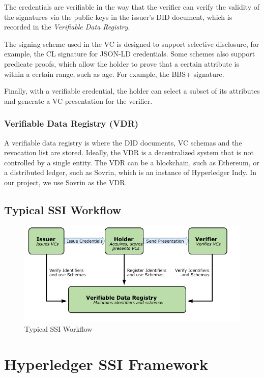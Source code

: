 \documentclass[
]{report}
\begin{document}
The credentials are verifiable in the way that the verifier can verify the
validity of the signatures via the public keys in the issuer's DID document,
which is recorded in the \emph{Verifiable Data Registry}.

The signing scheme used in the VC is designed to support selective disclosure,
for example, the CL signature for JSON-LD credentials. Some schemes also 
support predicate proofs, which allow the holder to prove that a certain
attribute is within a certain range, such as age. For example, the BBS+ 
signature.

Finally, with a verifiable credential, the holder can select a subset of its
attributes and generate a VC presentation for the verifier.

\subsubsection{Verifiable Data Registry (VDR)}
A verifiable data registry is where the DID documents, VC schemas and the
revocation list are stored. Ideally, the VDR is a decentralized system that
is not controlled by a single entity. The VDR can be a blockchain, such as
Ethereum, or a distributed ledger, such as Sovrin, which is an instance of
Hyperledger Indy. In our project, we use Sovrin as the VDR.

\subsection{Typical SSI Workflow}

\begin{figure}
\centering
\includegraphics[width=12cm]{ssi.png}
\caption{Typical SSI Workflow}
\end{figure}

\section{Hyperledger SSI Framework}
\end{document}
